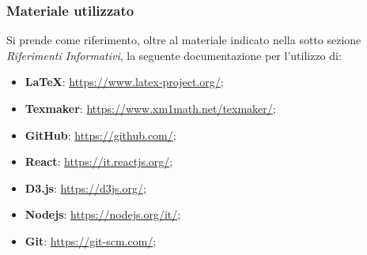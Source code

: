 \subsubsection{Materiale utilizzato}
Si prende come riferimento, oltre al materiale indicato nella sotto sezione \textit{Riferimenti Informativi}, la seguente documentazione per l'utilizzo di: 
\begin{itemize}
\item\textbf{\LaTeX}: \textcolor{blue}{\url{https://www.latex-project.org/}};
\item\textbf{Texmaker}: \textcolor{blue}{\url{https://www.xm1math.net/texmaker/}};
\item\textbf{GitHub}: \textcolor{blue}{\url{https://github.com/}};
\item\textbf{React}: \textcolor{blue}{\url{https://it.reactjs.org/}};
\item\textbf{D3.js}: \textcolor{blue}{\url{https://d3js.org/}};
\item\textbf{Nodejs}: \textcolor{blue}{\url{https://nodejs.org/it/}};
\item\textbf{Git}: \textcolor{blue}{\url{https://git-scm.com/}};



\end{itemize}